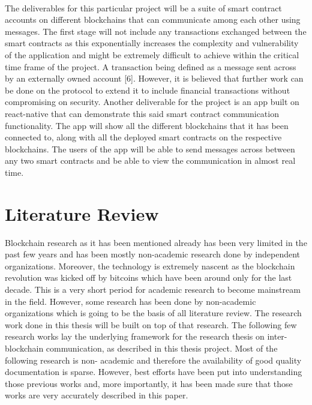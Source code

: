 \documentclass[a4paper,twoside,phd]{BYUPhys}
\begin{document}
\\
The deliverables for this particular project will be a suite of smart contract accounts on different blockchains that can communicate among each other using messages. The first stage will not include any transactions exchanged between the smart contracts as this exponentially increases the complexity and vulnerability of the application and might be extremely difficult to achieve within the critical time frame of the project. A transaction being defined as a message sent across by an externally owned account [6]. However, it is believed that further work can be done on the protocol to extend it to include financial transactions without compromising on security. Another deliverable for the project is an app built on react-native that can demonstrate this said smart contract communication functionality. The app will show all the different blockchains that it has been connected to, along with all the deployed smart contracts on the respective blockchains. The users of the app will be able to send messages across between any two smart contracts and be able to view the communication in almost real time.
\section{Literature Review}
Blockchain research as it has been mentioned already has been very limited in the past few years and has been mostly non-academic research done by independent organizations. Moreover, the technology is extremely nascent as the blockchain revolution was kicked off by bitcoins which have been around only for the last decade. This is a very short period for academic research to become mainstream in the field. However, some research has been done by non-academic organizations which is going to be the basis of all literature review. The research work done in this thesis will be built on top of that research. The following few research works lay the underlying framework for the research thesis on inter-blockchain communication, as described in this thesis project. Most of the following research is non- academic and therefore the availability of good quality documentation is sparse. However, best efforts have been put into understanding those previous works and, more importantly, it has been made sure that those works are very accurately described in this paper.
\end{document}
